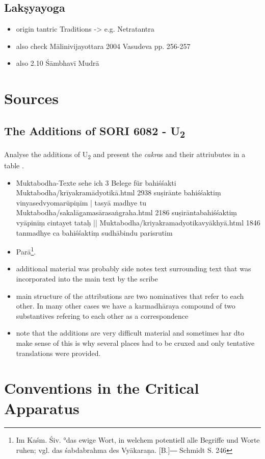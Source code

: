 \section{Lakṣyayoga}

\begin{itemize}
\item origin tantric Traditions -> e.g. Netratantra
\item also check Mālinivijayottara 2004 Vasudeva pp. 256-257
\item also  2.10 Śāmbhavī Mudrā
  \end{itemize} 

\chapter{Sources}
\section{The Additions of  SORI 6082 - U\textsubscript{2}}
\label{discussionu2}
Analyse the additions of U\textsubscript{2} and present the \textit{cakra}s and their attriubutes in a table .
\begin{itemize}
\item  Muktabodha-Texte sehe ich 3 Belege für bahiśśakti Muktabodha/krīyakramādyotikā.html 2938 suṣirānte bahiśśaktiṃ vinyasedvyomarūpiṇīm | tasyā madhye tu Muktabodha/sakalāgamasārasaṅgraha.html 2186 suṣirāntabahiśśaktiṃ vyāpinīṃ cintayet tataḥ || Muktabodha/kriyakramadyotikavyākhyā.html 1846 tanmadhye ca bahiśśaktiṃ sudhābindu parisrutim
\item  Parā\footnote{Im Kaśm. Śiv. °das ewige Wort, in welchem potentiell alle Begriffe und Worte ruhen; vgl. das śabdabrahma des Vyākaraṇa. [B.]― Schmidt S. 246}.
\item additional material was probably side notes text surrounding text that was incorporated into the main text by the scribe
\item main structure of the attributions are two nominatives that refer to each other. In many other cases we have a karmadhāraya compound of two substantives refering to each other as a correspondence
  \item note that the additions are very difficult material and sometimes har dto make sense of this is why several places had to be cruxed and only tentative translations were provided. 
  \end{itemize}

\chapter{Conventions in the Critical Apparatus}
